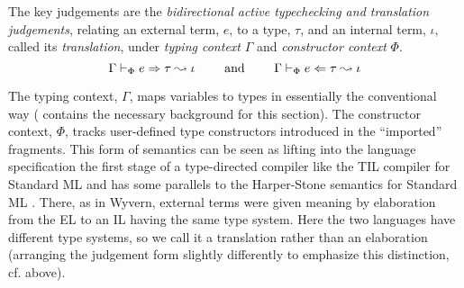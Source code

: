 \documentclass[10pt,preprint]{sigplanconf}
\newcommand{\lamAce}{\lambda_{\text{Ace}}}
\begin{document}
{%
The key judgements are the \emph{bidirectional active typechecking and translation judgements}, relating an external term, $e$, to a {type}, $\tau$, and an internal term, $\iota$, called its \emph{translation}, under \emph{typing context} $\Gamma$ and \emph{constructor context} $\Phi$.
\[\Gamma \vdash_\Phi e \Rightarrow \tau \leadsto \iota
~~~~~~~\text{and}~~~~~~~
\Gamma \vdash_\Phi e \Leftarrow \tau \leadsto \iota\]

The typing context, $\Gamma$, maps variables to types in essentially the conventional way (\cite{pfpl} contains the necessary background for this section). The constructor context, $\Phi$, tracks user-defined type  constructors introduced in the ``imported'' fragments. %
 This form of semantics can be seen as lifting into the language specification the first stage of a type-directed compiler like the TIL compiler for Standard ML \cite{tarditi+:til-OLD} and has some parallels to the Harper-Stone semantics for Standard ML \cite{Harper00atype-theoretic}. There, as in Wyvern, external terms were given meaning by elaboration from the EL to an IL having the same type system. Here the two languages have different type systems, so we call it a translation rather than an elaboration (arranging the judgement form slightly differently to emphasize this distinction, cf. above).

}
\end{document}

